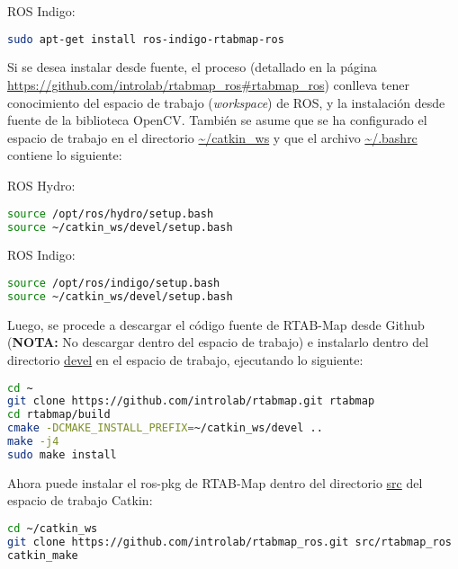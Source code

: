 \noindent ROS Indigo:
\begin{blackcodebox}
\begin{lstlisting}[language=bash]
sudo apt-get install ros-indigo-rtabmap-ros
\end{lstlisting}
\end{blackcodebox}

Si se desea instalar desde fuente, el proceso (detallado en la página \url{https://github.com/introlab/rtabmap_ros#rtabmap_ros}) conlleva tener conocimiento del espacio de trabajo (\textit{workspace}) de ROS, y la instalación desde fuente de la biblioteca OpenCV. También se asume que se ha configurado el espacio de trabajo en el directorio \url{~/catkin_ws} y que el archivo \url{~/.bashrc} contiene lo siguiente:

\noindent ROS Hydro:
\begin{blackcodebox}
\begin{lstlisting}[language=bash]
source /opt/ros/hydro/setup.bash
source ~/catkin_ws/devel/setup.bash
\end{lstlisting}
\end{blackcodebox}

\noindent ROS Indigo:
\begin{blackcodebox}
\begin{lstlisting}[language=bash]
source /opt/ros/indigo/setup.bash
source ~/catkin_ws/devel/setup.bash
\end{lstlisting}
\end{blackcodebox}

Luego, se procede a descargar el código fuente de RTAB-Map desde Github (\textbf{NOTA:} No descargar dentro del espacio de trabajo) e instalarlo dentro del directorio \url{devel} en el espacio de trabajo, ejecutando lo siguiente:
\begin{blackcodebox}
\begin{lstlisting}[language=bash]
cd ~
git clone https://github.com/introlab/rtabmap.git rtabmap
cd rtabmap/build
cmake -DCMAKE_INSTALL_PREFIX=~/catkin_ws/devel ..
make -j4
sudo make install
\end{lstlisting}
\end{blackcodebox}

Ahora puede instalar el ros-pkg de RTAB-Map dentro del directorio \url{src} del espacio de trabajo Catkin:
\begin{blackcodebox}
\begin{lstlisting}[language=bash]
cd ~/catkin_ws
git clone https://github.com/introlab/rtabmap_ros.git src/rtabmap_ros
catkin_make
\end{lstlisting}
\end{blackcodebox}

